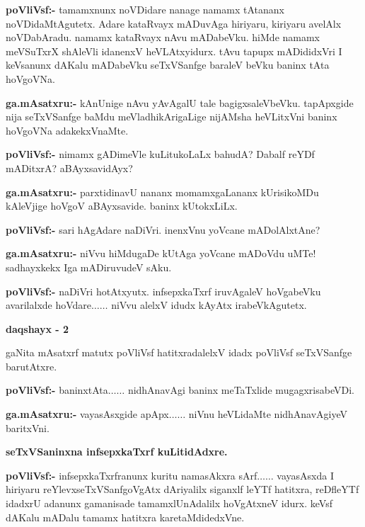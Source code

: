\smallskip
\noindent
\textbf{poVliVsf:-} tamamxnunx noVDidare nanage namamx tAtananx noVDidaMtAgutetx. Adare kataRvayx mADuvAga hiriyaru, kiriyaru avelAlx noVDabAradu. namamx kataRvayx nAvu mADabeVku. hiMde namamx meVSuTxrX shAleVli idanenxV heVLAtxyidurx. tAvu tapupx mADididxVri I keVsanunx dAKalu mADabeVku seTxVSanfge baraleV beVku baninx tAta hoVgoVNa.

\smallskip
\noindent
\textbf{ga.mAsatxru:-} kAnUnige nAvu yAvAgalU tale bagigxsaleVbeVku. tapApxgide nija seTxVSanfge baMdu meVladhikArigaLige nijAMsha heVLitxVni baninx hoVgoVNa adakekxVnaMte.

\smallskip
\noindent
\textbf{poVliVsf:-} nimamx gADimeVle kuLitukoLaLx bahudA? Dabalf reYDf mADitxrA? aBAyxsavidAyx?

\smallskip
\noindent
\textbf{ga.mAsatxru:-} parxtidinavU nananx momamxgaLananx kUrisikoMDu kAleVjige hoVgoV aBAyxsavide. baninx kUtokxLiLx.

\smallskip
\noindent
\textbf{poVliVsf:-} sari hAgAdare naDiVri. inenxVnu yoVcane mADolAlxtAne?

\smallskip
\noindent
\textbf{ga.mAsatxru:-} niVvu hiMdugaDe kUtAga yoVcane mADoVdu uMTe! sadhayxkekx Iga mADiruvudeV sAku.

\smallskip
\noindent
\textbf{poVliVsf:-} naDiVri hotAtxyutx. infsepxkaTxrf iruvAgaleV hoVgabeVku avarilalxde hoVdare$\ldots\ldots$ niVvu alelxV idudx kAyAtx irabeVkAgutetx.

\begin{center}
{\bf daqshayx - {\rm 2}}
\end{center}

gaNita mAsatxrf matutx poVliVsf hatitxradalelxV idadx poVliVsf seTxVSanfge barutAtxre.

\noindent
\textbf{poVliVsf:-} baninxtAta$\ldots\ldots$ nidhAnavAgi baninx meTaTxlide mugagxrisabeVDi.

\smallskip
\noindent
\textbf{ga.mAsatxru:-} vayasAsxgide apApx$\ldots\ldots$ niVnu heVLidaMte nidhAnavAgiyeV baritxVni.

\begin{center}
{\bf seTxVSaninxna infsepxkaTxrf kuLitidAdxre.}
\end{center}

\noindent
\textbf{poVliVsf:-} infsepxkaTxrfranunx kuritu namasAkxra sArf$\ldots\ldots$ vayasAsxda I hiriyaru reYlevxseTxVSanfgoVgAtx dAriyalilx siganxlf leYTf hatitxra, reDfleYTf idadxrU adanunx gamanisade tamamxlUnAdalilx hoVgAtxneV idurx. keVsf dAKalu mADalu tamamx hatitxra karetaMdidedxVne.

